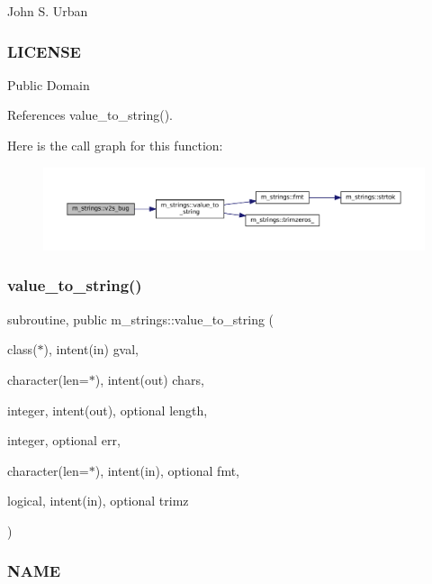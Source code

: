John S. Urban \subsubsection*{L\+I\+C\+E\+N\+SE}

Public Domain 

References value\+\_\+to\+\_\+string().

Here is the call graph for this function\+:
\nopagebreak
\begin{figure}[H]
\begin{center}
\leavevmode
\includegraphics[width=350pt]{namespacem__strings_a76a00e3ca7fb7c9b9cadcd484c6e3946_cgraph}
\end{center}
\end{figure}
\mbox{\label{namespacem__strings_a5dcd73626c8909c12f8ea29028927a88}} 
\subsubsection{\texorpdfstring{value\+\_\+to\+\_\+string()}{value\_to\_string()}}
{\footnotesize\ttfamily subroutine, public m\+\_\+strings\+::value\+\_\+to\+\_\+string (\begin{DoxyParamCaption}\item[{class($\ast$), intent(in)}]{gval,  }\item[{character(len=$\ast$), intent(out)}]{chars,  }\item[{integer, intent(out), optional}]{length,  }\item[{integer, optional}]{err,  }\item[{character(len=$\ast$), intent(in), optional}]{fmt,  }\item[{logical, intent(in), optional}]{trimz }\end{DoxyParamCaption})}



\subsubsection*{N\+A\+ME}

